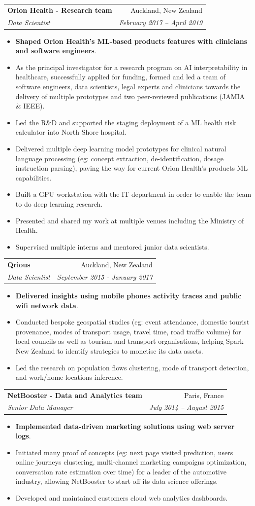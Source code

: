 \documentclass[letterpaper,11pt]{article}
\makeatletter
\newcommand{\resumeItemBis}[2]{
  \item\small{
    \textbf{#1}{#2 \vspace{-2pt}}
  }
}
\newcommand{\resumeSubheading}[4]{
  \vspace{-1pt}\item
    \begin{tabular*}{0.97\textwidth}[t]{l@{\extracolsep{\fill}}r}
      \textbf{#1} & #2 \\
      \textit{\small#3} & \textit{\small #4} \\
    \end{tabular*}\vspace{-5pt}
}
\newcommand{\resumeItemListStart}{\begin{itemize}}
\newcommand{\resumeItemListEnd}{\end{itemize}\vspace{-5pt}}
\makeatother
\begin{document}
    \resumeSubheading
      {Orion Health - Research team}{Auckland, New Zealand}
      {Data Scientist}{February 2017 -- April 2019}
      \resumeItemListStart
        \resumeItemBis{Shaped Orion Health's ML-based products features with clinicians and software engineers}{.}
        \resumeItemBis{} {As the principal investigator for a research program on AI interpretability in healthcare, successfully applied for funding, formed and led a team of software engineers, data scientists, legal experts and clinicians towards the delivery of multiple prototypes and two peer-reviewed publications (JAMIA \& IEEE).}
        \resumeItemBis{} {Led the R\&D and supported the staging deployment of a ML health risk calculator into North Shore hospital.}
        \resumeItemBis{} {Delivered multiple deep learning model prototypes for clinical natural language processing (eg: concept extraction, de-identification, dosage instruction parsing), paving the way for current Orion Health's products ML capabilities.}
        \resumeItemBis{} {Built a GPU workstation with the IT department in order to enable the team to do deep learning research.}
        \resumeItemBis{} {Presented and shared my work at multiple venues including the Ministry of Health.}
        \resumeItemBis{} {Supervised multiple interns and mentored junior data scientists.}
      \resumeItemListEnd

    \resumeSubheading
      {Qrious}{Auckland, New Zealand}
      {Data Scientist}{September 2015 - January 2017}
      \resumeItemListStart
        \resumeItemBis{Delivered insights using mobile phones activity traces and public wifi network data}{.}
        \resumeItemBis{} {Conducted bespoke geospatial studies (eg: event attendance, domestic tourist provenance, modes of transport usage, travel time, road traffic volume) for local councils as well as tourism and transport organisations, helping Spark New Zealand to identify strategies to monetise its data assets.}
        \resumeItemBis{} {Led the research on population flows clustering, mode of transport detection, and work/home locations inference.}
      \resumeItemListEnd

    \resumeSubheading
      {NetBooster - Data and Analytics team}{Paris, France}
      {Senior Data Manager}{July 2014 -- August 2015}
        \resumeItemListStart
        \resumeItemBis{Implemented data-driven marketing solutions using web server logs}{.}
        \resumeItemBis{} {Initiated many proof of concepts (eg: next page visited prediction, users online journeys clustering, multi-channel marketing campaigns optimization, conversation rate estimation over time) for a leader of the automotive industry, allowing NetBooster to start off its data science offerings.} 
        \resumeItemBis{} {Developed and maintained customers cloud web analytics dashboards.}
      \resumeItemListEnd
\end{document}
